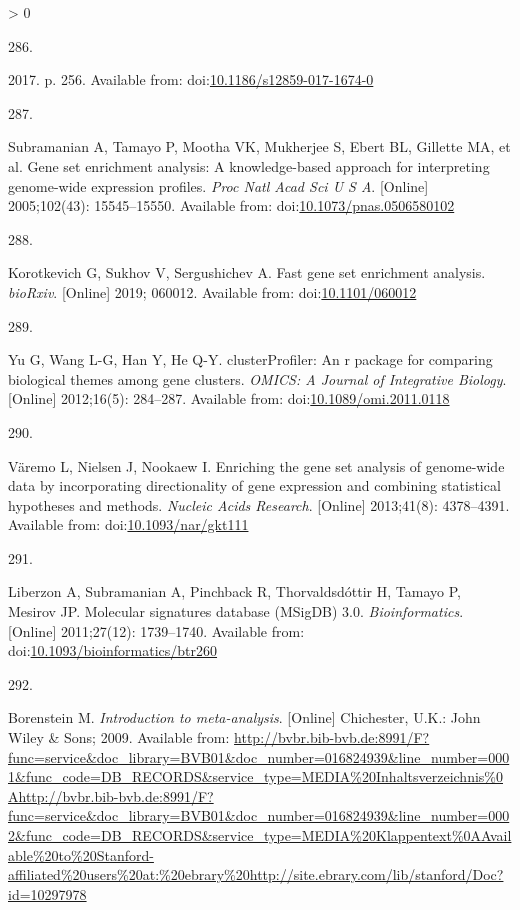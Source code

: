 \documentclass[twoside,10pt]{gihclass} %
\newlength{\cslhangindent}
\newlength{\csllabelwidth}
\newenvironment{CSLReferences}[3] %
 {%
  \setlength{\parindent}{0pt}
  \ifodd #1 \everypar{\setlength{\hangindent}{\cslhangindent}}\ignorespaces\fi
  \ifnum #2 > 0
  \setlength{\parskip}{#2\baselineskip}
  \fi
 }%
 {}
\newcommand{\CSLLeftMargin}[1]{\parbox[t]{\maxof{\widthof{#1}}{\csllabelwidth}}{#1}}
\newcommand{\CSLRightInline}[1]{\parbox[t]{\linewidth}{#1}}
\begin{document}
\begin{CSLReferences}{0}{0}
\leavevmode\hypertarget{ref-RN2435}{}%
\CSLLeftMargin{286. }
\CSLRightInline{2017. p. 256. Available from: doi:\href{https://doi.org/10.1186/s12859-017-1674-0}{10.1186/s12859-017-1674-0}}

\leavevmode\hypertarget{ref-RN2432}{}%
\CSLLeftMargin{287. }
\CSLRightInline{Subramanian A, Tamayo P, Mootha VK, Mukherjee S, Ebert BL, Gillette MA, et al. Gene set enrichment analysis: A knowledge-based approach for interpreting genome-wide expression profiles. \emph{Proc Natl Acad Sci U S A}. {[}Online{]} 2005;102(43): 15545--15550. Available from: doi:\href{https://doi.org/10.1073/pnas.0506580102}{10.1073/pnas.0506580102}}

\leavevmode\hypertarget{ref-RN2434}{}%
\CSLLeftMargin{288. }
\CSLRightInline{Korotkevich G, Sukhov V, Sergushichev A. Fast gene set enrichment analysis. \emph{bioRxiv}. {[}Online{]} 2019; 060012. Available from: doi:\href{https://doi.org/10.1101/060012}{10.1101/060012}}

\leavevmode\hypertarget{ref-clusterProfiler}{}%
\CSLLeftMargin{289. }
\CSLRightInline{Yu G, Wang L-G, Han Y, He Q-Y. clusterProfiler: An r package for comparing biological themes among gene clusters. \emph{OMICS: A Journal of Integrative Biology}. {[}Online{]} 2012;16(5): 284--287. Available from: doi:\href{https://doi.org/10.1089/omi.2011.0118}{10.1089/omi.2011.0118}}

\leavevmode\hypertarget{ref-RN2891}{}%
\CSLLeftMargin{290. }
\CSLRightInline{Väremo L, Nielsen J, Nookaew I. Enriching the gene set analysis of genome-wide data by incorporating directionality of gene expression and combining statistical hypotheses and methods. \emph{Nucleic Acids Research}. {[}Online{]} 2013;41(8): 4378--4391. Available from: doi:\href{https://doi.org/10.1093/nar/gkt111}{10.1093/nar/gkt111}}

\leavevmode\hypertarget{ref-RN2436}{}%
\CSLLeftMargin{291. }
\CSLRightInline{Liberzon A, Subramanian A, Pinchback R, Thorvaldsdóttir H, Tamayo P, Mesirov JP. Molecular signatures database (MSigDB) 3.0. \emph{Bioinformatics}. {[}Online{]} 2011;27(12): 1739--1740. Available from: doi:\href{https://doi.org/10.1093/bioinformatics/btr260}{10.1093/bioinformatics/btr260}}

\leavevmode\hypertarget{ref-RN2888}{}%
\CSLLeftMargin{292. }
\CSLRightInline{Borenstein M. \emph{Introduction to meta-analysis}. {[}Online{]} Chichester, U.K.: John Wiley \& Sons; 2009. Available from: \url{http://bvbr.bib-bvb.de:8991/F?func=service\&doc_library=BVB01\&doc_number=016824939\&line_number=0001\&func_code=DB_RECORDS\&service_type=MEDIA\%20Inhaltsverzeichnis\%0Ahttp://bvbr.bib-bvb.de:8991/F?func=service\&doc_library=BVB01\&doc_number=016824939\&line_number=0002\&func_code=DB_RECORDS\&service_type=MEDIA\%20Klappentext\%0AAvailable\%20to\%20Stanford-affiliated\%20users\%20at:\%20ebrary\%20http://site.ebrary.com/lib/stanford/Doc?id=10297978}}


\end{CSLReferences}
\end{document}
